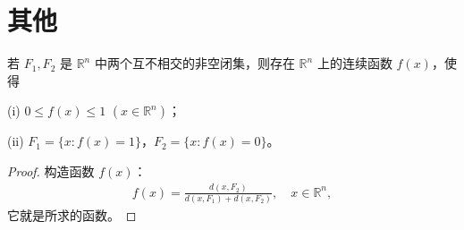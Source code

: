 \documentclass[../../main.tex]{subfiles}%
\begin{document}
\section{其他}

\begin{lemma}
若 \(F_1,F_2\) 是 \(\mathbb{R}^n\) 中两个互不相交的非空闭集，则存在 \(\mathbb{R}^n\) 上的连续函数 \(f(x)\)，使得

(i) \(0\leqslant f(x)\leqslant 1\) \((x\in\mathbb{R}^n)\)；

(ii) \(F_1 = \{x: f(x) = 1\}\)，\(F_2 = \{x: f(x) = 0\}\)。
\end{lemma}
\begin{proof}

构造函数 \(f(x)\)：
\begin{align*}
f(x)=\frac{d(x,F_2)}{d(x,F_1)+d(x,F_2)}, \quad x\in\mathbb{R}^n,
\end{align*}
它就是所求的函数。 

\end{proof}
\end{document}
